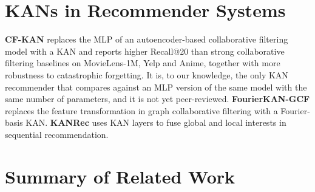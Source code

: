 \section{KANs in Recommender Systems}

\textbf{CF-KAN} \cite{park2024cfkan} replaces the MLP of an autoencoder-based
collaborative filtering model with a KAN and reports higher Recall@20 than strong
collaborative filtering baselines on MovieLens-1M, Yelp and Anime, together with
more robustness to catastrophic forgetting. It is, to our knowledge, the only KAN
recommender that compares against an MLP version of the same model with the same
number of parameters, and it is not yet peer-reviewed. \textbf{FourierKAN-GCF}
\cite{xu2024fkgcf} replaces the feature transformation in graph collaborative
filtering with a Fourier-basis KAN. \textbf{KANRec} \cite{xu2026kanrec} uses KAN
layers to fuse global and local interests in sequential recommendation.

\section{Summary of Related Work}


